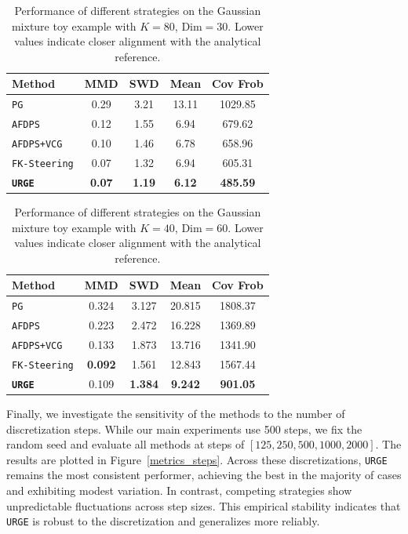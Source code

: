 \documentclass{article}
\theoremstyle{plain}
\theoremstyle{definition}
\theoremstyle{remark}
\begin{document}
\begin{table}[h]
\centering
\begin{tabular}{l c c c c}
\toprule
\textbf{Method}              & \textbf{MMD} & \textbf{SWD}  & \textbf{Mean}  & \textbf{Cov Frob} \\
\midrule
\texttt{PG}                  & 0.29 & 3.21 & 13.11 & 1029.85 \\
\texttt{AFDPS}               & 0.12 & 1.55 & 6.94 & 679.62 \\
\texttt{AFDPS+VCG}             & 0.10 & 1.46 & 6.78 & 658.96 \\
\texttt{FK-Steering}         & 0.07 & 1.32 & 6.94 & 605.31 \\
\textbf{\texttt{URGE}}                & \textbf{0.07} & \textbf{1.19} & \textbf{6.12} & \textbf{485.59} \\
\bottomrule
\end{tabular}
\caption{Performance of different strategies on the Gaussian mixture toy example with $K=80$, $\text{Dim}=30$. Lower values indicate closer alignment with the analytical reference.}
\label{tab:gmm_results_k80}
\end{table}

\begin{table}[h]
\centering
\begin{tabular}{l c c c c}
\toprule
\textbf{Method}              & \textbf{MMD} & \textbf{SWD}  & \textbf{Mean}  & \textbf{Cov Frob} \\
\midrule
\texttt{PG}                  & 0.324 & 3.127 & 20.815 & 1808.37 \\
\texttt{AFDPS}               & 0.223 & 2.472 & 16.228 & 1369.89 \\
\texttt{AFDPS+VCG}             & 0.133 & 1.873 & 13.716 & 1341.90 \\
\texttt{FK-Steering}         & \textbf{0.092} & 1.561 & 12.843 & 1567.44 \\
\textbf{\texttt{URGE}}       & 0.109 & \textbf{1.384} & \textbf{9.242} & \textbf{901.05} \\
\bottomrule
\end{tabular}
\caption{Performance of different strategies on the Gaussian mixture toy example with $K=40$, $\text{Dim}=60$. Lower values indicate closer alignment with the analytical reference.}
\label{tab:gmm_results_dim60}
\end{table}

Finally, we investigate the sensitivity of the methods to the number of discretization steps. While our main experiments use 500 steps, we fix the random seed and evaluate all methods at  steps of $[125, 250, 500, 1000, 2000]$. The results are plotted in Figure~\ref{metrics_steps}.  Across these discretizations, \texttt{URGE} remains the most consistent performer, achieving the best in the majority of cases and exhibiting modest variation. In contrast, competing strategies show unpredictable fluctuations across step sizes.  This empirical stability indicates that \texttt{URGE} is robust to the discretization and generalizes more reliably.
\end{document}
